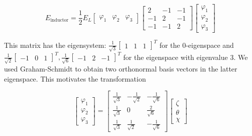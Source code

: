 \documentclass[11pt]{article}
\begin{document}
\begin{equation}
E_\text{inductor}
= \frac{1}{2} E_L
\begin{bmatrix}
	\varphi_1 & \varphi_2 & \varphi_3
\end{bmatrix}
\begin{bmatrix}
	2 & -1 & -1 \\
	-1 & 2 & -1 \\
	-1 & -1 & 2
\end{bmatrix}
\begin{bmatrix}
	\varphi_1 \\ \varphi_2 \\ \varphi_3
\end{bmatrix}
\end{equation}

This matrix has the eigensystem: $ \frac{1}{\sqrt{3}} \begin{bmatrix} 1 & 1 & 1 \end{bmatrix}^T $ for the 0-eigenspace and $ \frac{1}{\sqrt{2}} \begin{bmatrix} -1 & 0 & 1 \end{bmatrix}^T, \frac{1}{\sqrt{6}} \begin{bmatrix} -1 & 2 & -1 \end{bmatrix}^T $ for the eigenspace with eigenvalue 3. We used Graham-Schmidt to obtain two orthonormal basis vectors in the latter eigenspace. This motivates the transformation

\begin{equation}
\begin{bmatrix}
	\varphi_1 \\
	\varphi_2 \\
	\varphi_3
\end{bmatrix}
=
\begin{bmatrix}
	\frac{1}{\sqrt{3}} & -\frac{1}{\sqrt{2}} & -\frac{1}{\sqrt{6}} \\
	\frac{1}{\sqrt{3}} & 0 					 & \frac{2}{\sqrt{6}} \\
	\frac{1}{\sqrt{3}} & \frac{1}{\sqrt{2}}  & -\frac{1}{\sqrt{6}}
\end{bmatrix}
\begin{bmatrix}
	\zeta \\ \theta \\ \chi
\end{bmatrix}
\end{equation}
\end{document}
